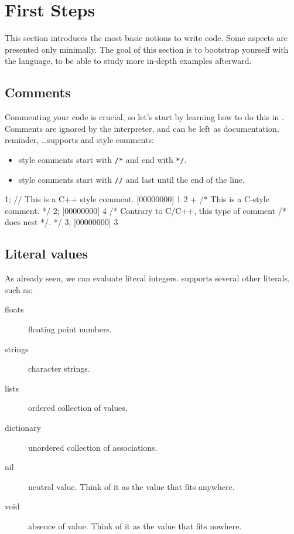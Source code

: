 
\chapter{First Steps}
\label{sec:tut:first}
This section introduces the most basic notions to write \us code. Some
aspects are presented only minimally.  The goal of this section is to
bootstrap yourself with the \us language, to be able to study more
in-depth examples afterward.

\section{Comments}

Commenting your code is crucial, so let's start by learning how to do
this in \us. Comments are ignored by the interpreter, and
can be left as documentation, reminder, \ldots \us supports \langC and
\Cxx style comments:

\begin{itemize}
\item \langC style comments start with \texttt{/*} and end with \texttt{*/}.
\item \Cxx style comments start with \texttt{//} and last until the
  end of the line.
\end{itemize}

\begin{urbiscript}[firstnumber=1]
1; // This is a C++ style comment.
[00000000] 1
2 + /* This is a C-style comment. */ 2;
[00000000] 4
/* Contrary to C/C++, this type of comment /* does nest */. */
3;
[00000000] 3
\end{urbiscript}


\section{Literal values}

As already seen, we can evaluate literal integers. \us supports
several other literals, such as:

\begin{description}
\item[floats] floating point numbers.
\item[strings] character strings.
\item[lists] ordered collection of values.
\item[dictionary] unordered collection of associations.
\item[nil] neutral value. Think of it as the value that fits anywhere.
\item[void] absence of value. Think of it as the value that fits nowhere.
\end{description}

